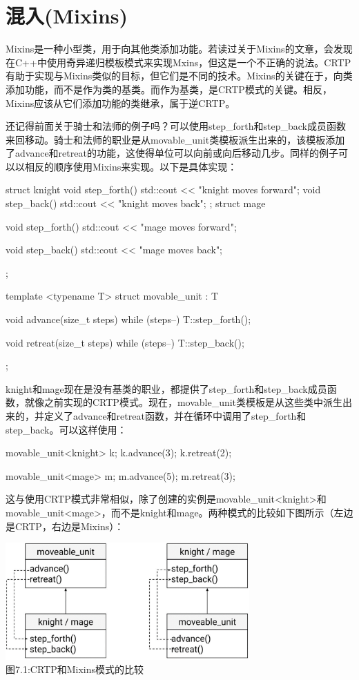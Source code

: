 \section{混入(Mixins)}
Mixins是一种小型类，用于向其他类添加功能。若读过关于Mixins的文章，会发现在C++中使用奇异递归模板模式来实现Mxins，但这是一个不正确的说法。CRTP有助于实现与Mixins类似的目标，但它们是不同的技术。Mixins的关键在于，向类添加功能，而不是作为类的基类。而作为基类，是CRTP模式的关键。相反，Mixins应该从它们添加功能的类继承，属于逆CRTP。

还记得前面关于骑士和法师的例子吗？可以使用step\_forth和step\_back成员函数来回移动。骑士和法师的职业是从movable\_unit类模板派生出来的，该模板添加了advance和retreat的功能，这使得单位可以向前或向后移动几步。同样的例子可以以相反的顺序使用Mixins来实现。以下是具体实现：

\begin{cpp}
struct knight
{
	void step_forth()
	{
		std::cout << "knight moves forward\n";
	}
	void step_back()
	{
		std::cout << "knight moves back\n";
	}
};
struct mage
{
	void step_forth()
	{
		std::cout << "mage moves forward\n";
	}

	void step_back()
	{
		std::cout << "mage moves back\n";
	}
};

template <typename T>
struct movable_unit : T
{
	void advance(size_t steps)
	{
		while (steps--)
			T::step_forth();
	}

	void retreat(size_t steps)
	{
		while (steps--)
			T::step_back();
	}
};
\end{cpp}

knight和mage现在是没有基类的职业，都提供了step\_forth和step\_back成员函数，就像之前实现的CRTP模式。现在，movable\_unit类模板是从这些类中派生出来的，并定义了advance和retreat函数，并在循环中调用了step\_forth和step\_back。可以这样使用：

\begin{cpp}
movable_unit<knight> k;
k.advance(3);
k.retreat(2);

movable_unit<mage> m;
m.advance(5);
m.retreat(3);
\end{cpp}

这与使用CRTP模式非常相似，除了创建的实例是movable\_unit<knight>和movable\_unit<mage>，而不是knight和mage。两种模式的比较如下图所示（左边是CRTP，右边是Mixins）：

\begin{center}
\includegraphics[width=0.7\textwidth]{images/1.png}\\
图7.1:CRTP和Mixins模式的比较
\end{center}

